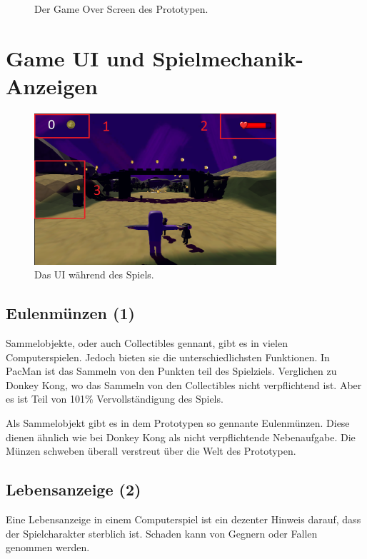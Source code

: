 \begin{figure}[H]
\begin{minipage}{0.4\textwidth}
        \caption{Der Game Over Screen des Prototypen.}
        \label{UI02}
    \end{minipage}
\end{figure}



\section{Game UI und Spielmechanik-Anzeigen}

\begin{figure}[H]
    \centering
    \includegraphics[width=0.8\textwidth]{chapters/03/images/GameUI.png}
    \caption{Das UI während des Spiels.}
    \label{htl03}
\end{figure}

\subsection{Eulenmünzen (1)}
Sammelobjekte, oder auch Collectibles gennant, gibt es in vielen Computerspielen. Jedoch bieten sie die unterschiedlichsten Funktionen. In PacMan ist das Sammeln von den Punkten teil des Spielziels. Verglichen zu Donkey Kong, wo das Sammeln von den Collectibles nicht verpflichtend ist. Aber es ist Teil von 101\% Vervollständigung des Spiels.

Als Sammelobjekt gibt es in dem Prototypen so gennante \glqq Eulenmünzen\grqq. Diese dienen ähnlich wie bei Donkey Kong als nicht verpflichtende Nebenaufgabe. Die Münzen schweben überall verstreut über die Welt des Prototypen. 

\subsection{Lebensanzeige (2)}

Eine Lebensanzeige in einem Computerspiel ist ein dezenter Hinweis darauf, dass der Spielcharakter sterblich ist. Schaden kann von Gegnern oder Fallen genommen werden.

